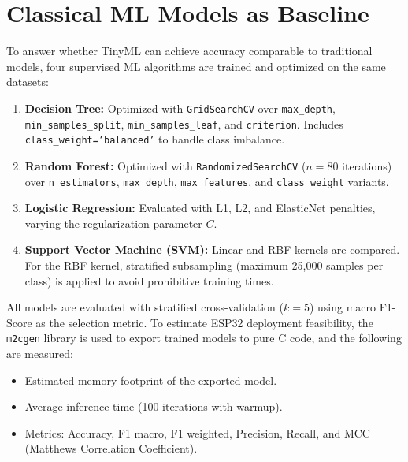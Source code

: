 \section{Classical ML Models as Baseline}
\label{sec:ml_classic}

To answer whether TinyML can achieve accuracy comparable to traditional models, four supervised ML algorithms are trained and optimized on the same datasets:

\begin{enumerate}
    \item \textbf{Decision Tree:} Optimized with \texttt{GridSearchCV} over \texttt{max\_depth}, \texttt{min\_samples\_split}, \texttt{min\_samples\_leaf}, and \texttt{criterion}. Includes \texttt{class\_weight='balanced'} to handle class imbalance.

    \item \textbf{Random Forest:} Optimized with \texttt{RandomizedSearchCV} ($n=80$ iterations) over \texttt{n\_estimators}, \texttt{max\_depth}, \texttt{max\_features}, and \texttt{class\_weight} variants.

    \item \textbf{Logistic Regression:} Evaluated with L1, L2, and ElasticNet penalties, varying the regularization parameter $C$.

    \item \textbf{Support Vector Machine (SVM):} Linear and RBF kernels are compared. For the RBF kernel, stratified subsampling (maximum 25,000 samples per class) is applied to avoid prohibitive training times.
\end{enumerate}

All models are evaluated with stratified cross-validation ($k=5$) using macro F1-Score as the selection metric. To estimate ESP32 deployment feasibility, the \texttt{m2cgen} library is used to export trained models to pure C code, and the following are measured:
\begin{itemize}
    \item Estimated memory footprint of the exported model.
    \item Average inference time (100 iterations with warmup).
    \item Metrics: Accuracy, F1 macro, F1 weighted, Precision, Recall, and MCC (Matthews Correlation Coefficient).
\end{itemize}

